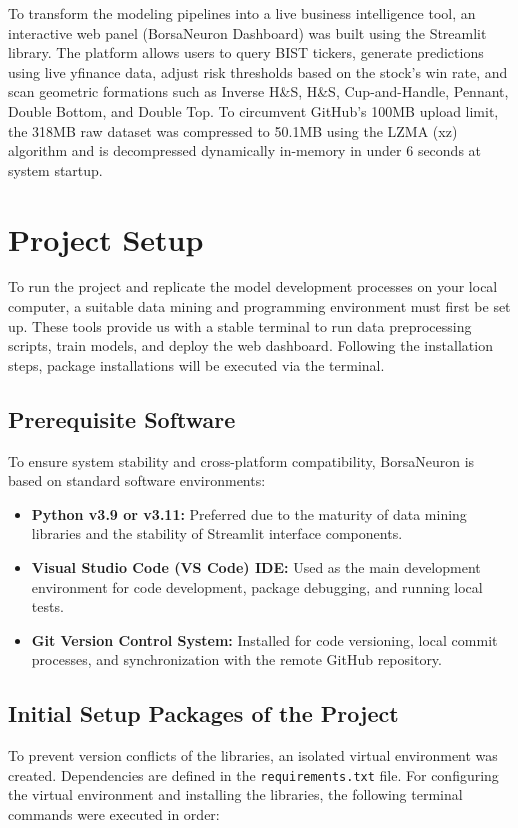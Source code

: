 \documentclass[12pt,a4paper]{report}
\begin{document}
To transform the modeling pipelines into a live business intelligence tool, an interactive web panel (BorsaNeuron Dashboard) was built using the Streamlit library. The platform allows users to query BIST tickers, generate predictions using live yfinance data, adjust risk thresholds based on the stock's win rate, and scan geometric formations such as Inverse H&S, H&S, Cup-and-Handle, Pennant, Double Bottom, and Double Top. To circumvent GitHub's 100MB upload limit, the 318MB raw dataset was compressed to 50.1MB using the LZMA (xz) algorithm and is decompressed dynamically in-memory in under 6 seconds at system startup.

\chapter{Project Setup}

To run the project and replicate the model development processes on your local computer, a suitable data mining and programming environment must first be set up. These tools provide us with a stable terminal to run data preprocessing scripts, train models, and deploy the web dashboard. Following the installation steps, package installations will be executed via the terminal.

\section{Prerequisite Software}
To ensure system stability and cross-platform compatibility, BorsaNeuron is based on standard software environments:
\begin{itemize}
    \item \textbf{Python v3.9 or v3.11:} Preferred due to the maturity of data mining libraries and the stability of Streamlit interface components.
    \item \textbf{Visual Studio Code (VS Code) IDE:} Used as the main development environment for code development, package debugging, and running local tests.
    \item \textbf{Git Version Control System:} Installed for code versioning, local commit processes, and synchronization with the remote GitHub repository.
\end{itemize}

\newpage
\section{Initial Setup Packages of the Project}
To prevent version conflicts of the libraries, an isolated virtual environment was created. Dependencies are defined in the \texttt{requirements.txt} file. For configuring the virtual environment and installing the libraries, the following terminal commands were executed in order:
\end{document}
